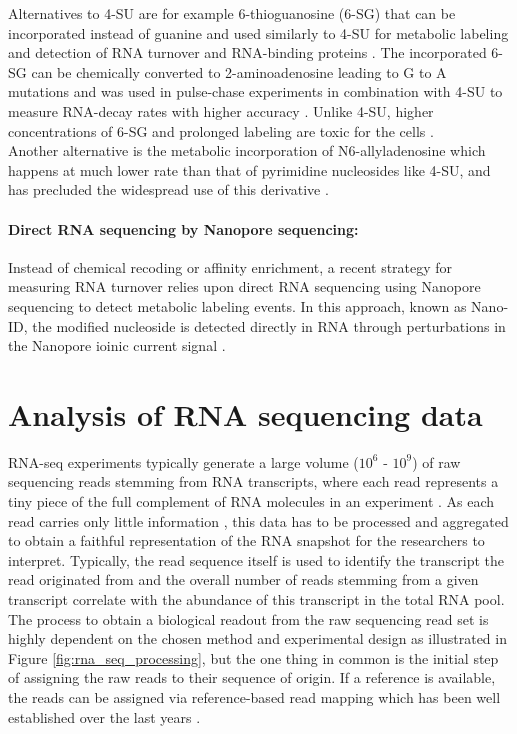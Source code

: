 Alternatives to 4-SU are for example 6-thioguanosine (6-SG) that can be incorporated instead of guanine and used similarly to 4-SU for metabolic labeling and detection of RNA turnover and RNA-binding proteins \citep{Gasser2020,Hafner2010}. The incorporated 6-SG can be chemically converted to 2-aminoadenosine leading to G to A mutations and was used in pulse-chase experiments in combination with 4-SU to measure RNA-decay rates with higher accuracy \citep{Gasser2020}. Unlike 4-SU, higher concentrations of 6-SG and prolonged labeling are toxic for the cells \citep{Woodford1988}. \\
Another alternative is the metabolic incorporation of N6-allyladenosine which happens at much lower rate than that of pyrimidine nucleosides like 4-SU, and has precluded the widespread use of this derivative \citep{Shu2017}.

\paragraph{Direct RNA sequencing by Nanopore sequencing:}

 Instead of chemical recoding or affinity enrichment, a recent strategy for measuring RNA turnover relies upon direct RNA sequencing using Nanopore sequencing to detect metabolic labeling events. In this approach, known as Nano-ID, the modified nucleoside is detected directly in RNA through perturbations in the Nanopore ioinic current signal \citep{Maier2020}.
 
\section{Analysis of RNA sequencing data}

RNA-seq experiments typically generate a large volume ($10^6$ - $10^9$) of raw sequencing reads stemming from RNA transcripts, where each read represents a tiny piece of the full complement of RNA molecules in an experiment \citep{Lowe2017}. As each read carries only little information \citep{Canzar2015}, this data has to be processed and aggregated to obtain a faithful representation of the RNA snapshot for the researchers to interpret. Typically, the read sequence itself is used to identify the transcript the read originated from and the overall number of reads stemming from a given transcript correlate with the abundance of this transcript in the total RNA pool. The process to obtain a biological readout from the raw sequencing read set is highly dependent on the chosen method and experimental design as illustrated in Figure \ref{fig:rna_seq_processing}, but the one thing in common is the initial step of assigning the raw reads to their sequence of origin. If a reference is available, the reads can be assigned via reference-based read mapping which has been well established over the last years \citep{Haas2010}. 

